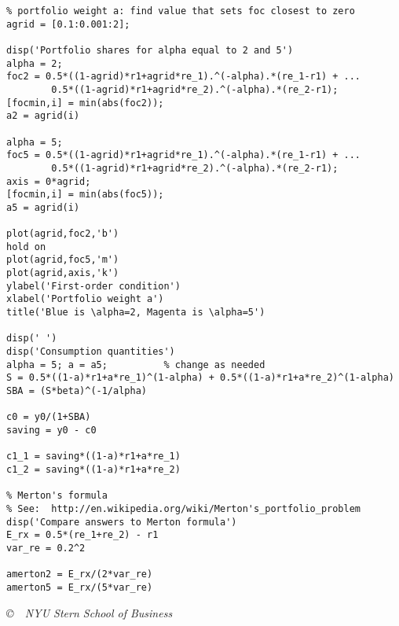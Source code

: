 \begin{enumerate}
\begin{verbatim}
% portfolio weight a: find value that sets foc closest to zero
agrid = [0.1:0.001:2];

disp('Portfolio shares for alpha equal to 2 and 5')
alpha = 2;
foc2 = 0.5*((1-agrid)*r1+agrid*re_1).^(-alpha).*(re_1-r1) + ...
        0.5*((1-agrid)*r1+agrid*re_2).^(-alpha).*(re_2-r1);
[focmin,i] = min(abs(foc2));
a2 = agrid(i)

alpha = 5;
foc5 = 0.5*((1-agrid)*r1+agrid*re_1).^(-alpha).*(re_1-r1) + ...
        0.5*((1-agrid)*r1+agrid*re_2).^(-alpha).*(re_2-r1);
axis = 0*agrid;
[focmin,i] = min(abs(foc5));
a5 = agrid(i)

plot(agrid,foc2,'b')
hold on
plot(agrid,foc5,'m')
plot(agrid,axis,'k')
ylabel('First-order condition')
xlabel('Portfolio weight a')
title('Blue is \alpha=2, Magenta is \alpha=5')

disp(' ')
disp('Consumption quantities')
alpha = 5; a = a5;          % change as needed
S = 0.5*((1-a)*r1+a*re_1)^(1-alpha) + 0.5*((1-a)*r1+a*re_2)^(1-alpha)
SBA = (S*beta)^(-1/alpha)

c0 = y0/(1+SBA)
saving = y0 - c0

c1_1 = saving*((1-a)*r1+a*re_1)
c1_2 = saving*((1-a)*r1+a*re_2)

% Merton's formula
% See:  http://en.wikipedia.org/wiki/Merton's_portfolio_problem
disp('Compare answers to Merton formula')
E_rx = 0.5*(re_1+re_2) - r1
var_re = 0.2^2

amerton2 = E_rx/(2*var_re)
amerton5 = E_rx/(5*var_re)
\end{verbatim}

\end{enumerate}

\vfill
{\bigskip \centerline{\it \copyright \ \number\year \
NYU Stern School of Business}
}



